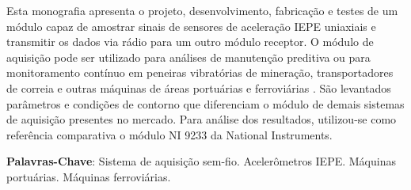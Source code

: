 \documentclass[
	12pt,				%
	openright,			%
	twoside,			%
	a4paper,			%
	english,			%
	french,				%
	spanish,			%
	brazil,				%
	]{abntex2}
\begin{document}
\frenchspacing 


\imprimircapa

\imprimirfolhaderosto




\setlength{\absparsep}{18pt} %
\begin{resumo}
	Esta monografia apresenta o projeto, desenvolvimento, fabricação e testes de um módulo capaz de amostrar sinais de sensores de aceleração IEPE uniaxiais e transmitir os dados via rádio para um outro módulo receptor. O módulo de aquisição pode ser utilizado para análises de manutenção preditiva ou para monitoramento contínuo em peneiras vibratórias de mineração, transportadores de correia e outras máquinas de áreas portuárias e ferroviárias . São levantados parâmetros e condições de contorno que diferenciam o módulo de demais sistemas de aquisição presentes no mercado. Para análise dos resultados, utilizou-se como referência comparativa o módulo NI 9233 da National Instruments.

	\vspace{\onelineskip}

	\noindent 
	\textbf{Palavras-Chave}: Sistema de aquisição sem-fio. Acelerômetros IEPE. Máquinas portuárias. Máquinas ferroviárias.
\end{resumo}
\end{document}
